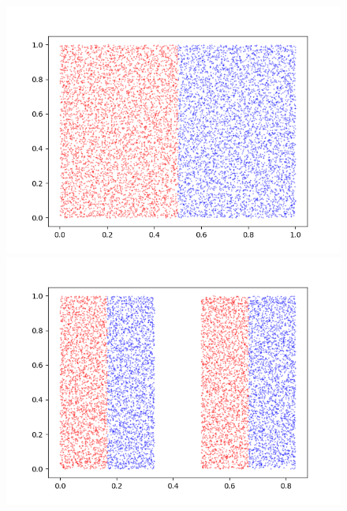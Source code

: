 \documentclass[12pt]{article}
\theoremstyle{plain}
\begin{document}
\begin{figure}[H]
\begin{minipage}[c][0.24\width]{
   0.24\textwidth}
   \centering
   \includegraphics[width=1\textwidth]{figure/section5/baker-0.png}
\end{minipage}
\begin{minipage}[c][0.24\width]{
   0.24\textwidth}
   \centering
   \includegraphics[width=1\textwidth]{figure/section5/baker-1-0*33-0*5.png}
\end{minipage}
\begin{minipage}[c][0.24\width]{
   0.24\textwidth}
   \centering

\end{minipage}
\end{figure}
\end{document}
